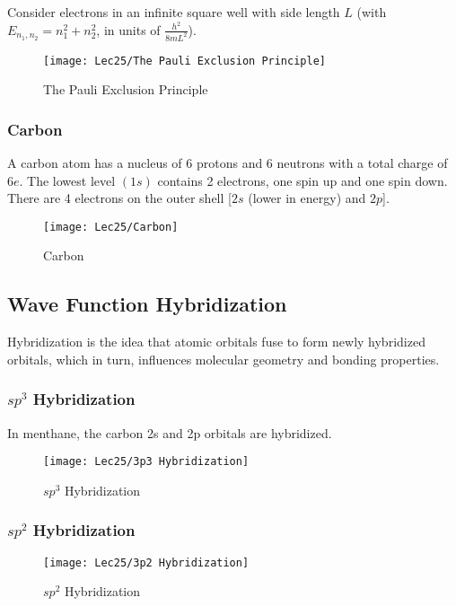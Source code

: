Consider electrons in an infinite square well with side length $L$ (with $E_{n_1,n_2}=n_1^2+n_2^2$, in units of $\frac{h^2}{8mL^2}$). 

\begin{figure}[H]
    \centering
    \texttt{[image: Lec25/The Pauli Exclusion Principle]}
    \caption{The Pauli Exclusion Principle}
\end{figure}

\subsubsection{Carbon}
A carbon atom has a nucleus of 6 protons and 6 neutrons with a total charge of $6e$. The lowest level $(1s)$ contains 2 electrons, one spin up and one spin down. There are 4 electrons on the outer shell [$2s$ (lower in energy) and $2p$].

\begin{figure}[H]
    \centering
    \texttt{[image: Lec25/Carbon]}
    \caption{Carbon}
\end{figure}

\subsection{Wave Function Hybridization}
Hybridization is the idea that atomic orbitals fuse to form newly hybridized orbitals, which in turn, influences molecular geometry and bonding properties. 

\subsubsection{\texorpdfstring{$sp^3$}. Hybridization}
In menthane, the carbon 2s and 2p orbitals are hybridized.

\begin{figure}[H]
    \centering
    \texttt{[image: Lec25/3p3 Hybridization]}
    \caption{$sp^3$ Hybridization}
\end{figure}

\subsubsection{\texorpdfstring{$sp^2$}. Hybridization}

\begin{figure}[H]
    \centering
    \texttt{[image: Lec25/3p2 Hybridization]}
    \caption{$sp^2$ Hybridization}
\end{figure}
